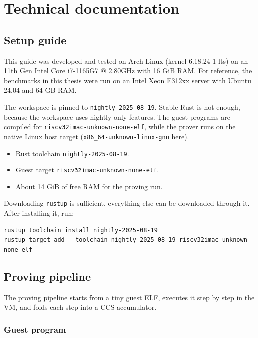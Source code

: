 \thispagestyle{empty}
\renewcommand*{\thepage}{C-\arabic{page}}

\chapter{Technical documentation}

\section{Setup guide}

This guide was developed and tested on Arch Linux (kernel 6.18.24-1-lts) on an
11th Gen Intel Core i7-1165G7 @ 2.80GHz with 16 GiB RAM. For reference, the
benchmarks in this thesis were run on an Intel Xeon E312xx server with Ubuntu
24.04 and 64 GB RAM.

The workspace is pinned to \texttt{nightly-2025-08-19}. Stable Rust is not
enough, because the workspace uses nightly-only features. The guest programs are
compiled for \texttt{riscv32imac-unknown-none-elf}, while the prover runs on the
native Linux host target (\texttt{x86\_64-unknown-linux-gnu} here).

\begin{itemize}
	\item Rust toolchain \texttt{nightly-2025-08-19}.
	\item Guest target \texttt{riscv32imac-unknown-none-elf}.
	\item About 14 GiB of free RAM for the proving run.
\end{itemize}

Downloading \texttt{rustup} is sufficient, everything else can be downloaded through it.
After installing it, run:

\begin{verbatim}
rustup toolchain install nightly-2025-08-19
rustup target add --toolchain nightly-2025-08-19 riscv32imac-unknown-none-elf
\end{verbatim}

\section{Proving pipeline}

The proving pipeline starts from a tiny guest ELF, executes it step by step in the VM, and folds each step into a CCS accumulator.

\subsection{Guest program}

